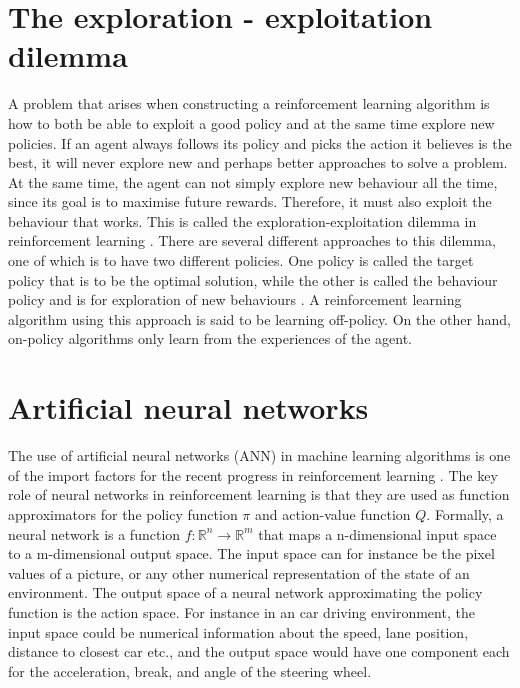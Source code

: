 \documentclass[class=book, crop=false]{standalone}
\begin{document}
\section{The exploration - exploitation dilemma}
A problem that arises when constructing a reinforcement learning algorithm is how to both be able to exploit a good policy and at the same time explore new policies. If an agent always follows its policy and picks the action it believes is the best, it will never explore new and perhaps better approaches to solve a problem. At the same time, the agent can not simply explore new behaviour all the time, since its goal is to maximise future rewards. Therefore, it must also exploit the behaviour that works. This is called the exploration-exploitation dilemma in reinforcement learning \cite{Sutton1998}. There are several different approaches to this dilemma, one of which is to have two different policies. One policy is called the target policy that is to be the optimal solution, while the other is called the behaviour policy and is for exploration of new behaviours \cite{Sutton1998}. A reinforcement learning algorithm using this approach is said to be learning off-policy. On the other hand, on-policy algorithms only learn from the experiences of the agent.

\section{Artificial neural networks}
The use of artificial neural networks (ANN) in machine learning algorithms is one of the import factors for the recent progress in reinforcement learning \cite{Sutton1998}. The key role of neural networks in reinforcement learning is that they are used as function approximators for the policy function $\pi$ and action-value function $Q$. Formally, a neural network is a function $f: \mathbb{R}^{n} \to \mathbb{R}^{m}$ that maps a n-dimensional input space to a m-dimensional output space. The input space can for instance be the pixel values of a picture, or any other numerical representation of the state of an environment. The output space of a neural network approximating the policy function is the action space. For instance in an car driving environment, the input space could be numerical information about the speed, lane position, distance to closest car etc., and the output space would have one component each for the acceleration, break, and angle of the steering wheel.
\end{document}
